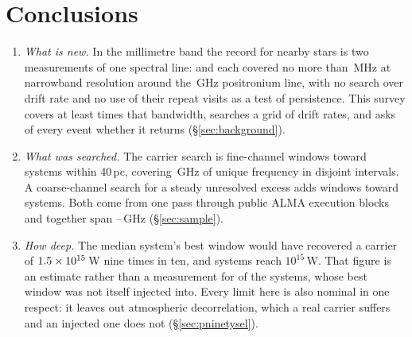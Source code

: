 \section{Conclusions}
\label{sec:conclusions}

\begin{enumerate}[leftmargin=1.6em,itemsep=4pt,topsep=4pt,parsep=0pt]

\item \emph{What is new.} In the millimetre band the record for nearby stars
is two measurements of one spectral line: \citet{Steffes1994} and
\citet{Mauersberger1996} each covered no more than \SbPriorBandMHz\,MHz at
narrowband resolution around the \SbPriorFreqGHz\,GHz positronium line, with
no search over drift rate and
no use of their repeat visits as a test of persistence. This survey covers at
least \SbPriorRatio{} times that bandwidth, searches a grid of drift rates,
and asks of every event whether it returns (\S\ref{sec:background}).

\item \emph{What was searched.} The carrier search is \NWinA{} fine-channel
windows toward \NSysClassA{} systems within 40\,pc, covering \CvUnionA\,GHz
of unique frequency in \CovNIslands{} disjoint intervals. A coarse-channel
search for a steady unresolved excess adds \NWinB{} windows toward
\PrSysClassB{} systems. Both come from one pass through \NEB{} public ALMA
execution blocks and together span \SurvFreqLo--\SurvFreqHi\,GHz
(\S\ref{sec:sample}).

\item \emph{How deep.} The median system's best window would have recovered
a carrier of $1.5\times10^{15}$\,W nine times in ten, and \NSysEfifteen{}
systems reach $10^{15}$\,W. That figure is an estimate rather than a
measurement for \SmcNEstSys{} of the \NSysClassA{} systems, whose best window
was not itself injected into. Every limit here is also nominal in one
respect: it leaves out atmospheric decorrelation, which a real carrier
suffers and an injected one does not (\S\ref{sec:pninetysel}).


\end{enumerate}
